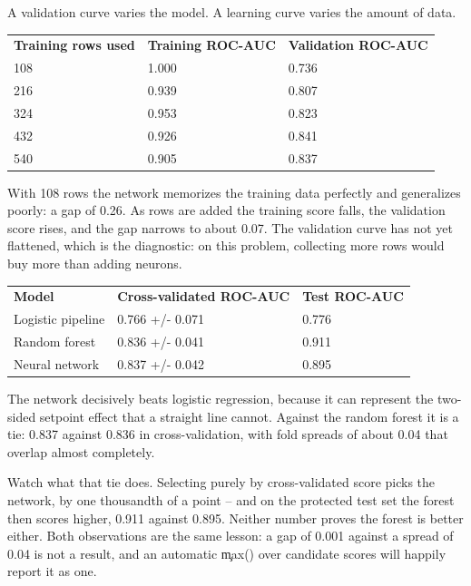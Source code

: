 
A validation curve varies the model. A learning curve varies the amount of data.

\begin{center}
\begin{tabular}{lll}
\textbf{Training rows used} & \textbf{Training ROC-AUC} & \textbf{Validation ROC-AUC} \\
108 & 1.000 & 0.736 \\
216 & 0.939 & 0.807 \\
324 & 0.953 & 0.823 \\
432 & 0.926 & 0.841 \\
540 & 0.905 & 0.837 \\
\end{tabular}
\end{center}

With 108 rows the network memorizes the training data perfectly and generalizes
poorly: a gap of 0.26. As rows are added the training score falls, the validation
score rises, and the gap narrows to about 0.07. The validation curve has not yet
flattened, which is the diagnostic: on this problem, collecting more rows would
buy more than adding neurons.


\begin{center}
\begin{tabular}{lll}
\textbf{Model} & \textbf{Cross-validated ROC-AUC} & \textbf{Test ROC-AUC} \\
Logistic pipeline & 0.766 +/- 0.071 & 0.776 \\
Random forest & 0.836 +/- 0.041 & 0.911 \\
Neural network & 0.837 +/- 0.042 & 0.895 \\
\end{tabular}
\end{center}

The network decisively beats logistic regression, because it can represent the
two-sided setpoint effect that a straight line cannot. Against the random forest
it is a tie: 0.837 against 0.836 in cross-validation, with fold spreads of about
0.04 that overlap almost completely.

Watch what that tie does. Selecting purely by cross-validated score picks the
network, by one thousandth of a point -- and on the protected test set the forest
then scores higher, 0.911 against 0.895. Neither number proves the forest is
better either. Both observations are the same lesson: a gap of 0.001 against a
spread of 0.04 is not a result, and an automatic \c{max()} over candidate scores
will happily report it as one.

